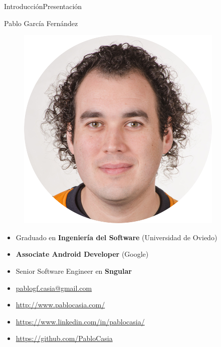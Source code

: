 \begin{frame}{Introducción}{Presentación}
 \begin{block}{Pablo García Fernández}
  \vspace{\baselineskip}
  \begin{figure}[h]
   \centering
   \includegraphics[width=\textwidth]{images/introduction/me_round}
  \end{figure}
  \endminipage
  \begin{itemize}
   \item Graduado en \textbf{Ingeniería del Software} (Universidad de Oviedo)
   \item \textbf{Associate Android Developer} (Google)
   \item Senior Software Engineer en \textbf{Sngular}
  \end{itemize}
  \endminipage\hfill
 \end{block}
 \begin{itemize}
  \item \href{mailto:pablogf.casia@gmail.com}{{\faEnvelope} pablogf.casia@gmail.com}
  \item \href{http://www.pablocasia.com/}{{\faDesktop} http://www.pablocasia.com/}
  \item \href{https://www.linkedin.com/in/pablocasia/}{{\faLinkedin} https://www.linkedin.com/in/pablocasia/}
  \item \href{https://github.com/PabloCasia}{{\faGithub} https://github.com/PabloCasia}
 \end{itemize}
\end{frame}

